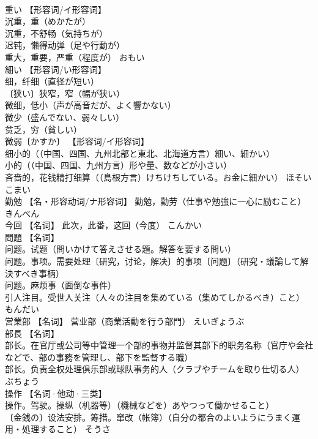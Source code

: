 \documentclass[8pt]{extreport}
\begin{document}
\begin{CJK}{UTF8}{min}
\\	重い	【形容词/イ形容词】 
\\	沉重，重（めかたが） 
\\	沉重，不舒畅（気持ちが） 
\\	迟钝，懒得动弹（足や行動が） 
\\	重大，重要，严重（程度が）	おもい	
\\	細い	【形容词/い形容词】 
\\	细，纤细（直径が短い） 
\\	〔狭い〕狭窄，窄（幅が狭い） 
\\	微细，低小（声が高音だが、よく響かない） 
\\	微少（盛んでない、弱々しい） 
\\	贫乏，穷（貧しい） 
\\	微弱〔かすか〕 【形容词/イ形容词】 
\\	细小的（（中国、四国、九州北部と東北、北海道方言）細い、細かい） 
\\	小的（（中国、四国、九州方言）形や量、数などが小さい） 
\\	吝啬的，花钱精打细算（（島根方言）けちけちしている。お金に細かい）	ほそい こまい	
\\	勤勉	【名・形容动词/ナ形容词】 勤勉，勤劳（仕事や勉強に一心に励むこと）	きんべん	
\\	今回	【名词】 此次，此番，这回（今度）	こんかい	
\\	問題	【名词】 
\\	问题。试题（問いかけて答えさせる題。解答を要する問い） 
\\	问题。事项。需要处理〔研究，讨论，解决〕的事项〔问题〕（研究・議論して解決すべき事柄） 
\\	问题。麻烦事（面倒な事件） 
\\	引人注目。受世人关注（人々の注目を集めている（集めてしかるべき）こと）	もんだい	
\\	営業部	【名词】 营业部（商業活動を行う部門）	えいぎょうぶ	
\\	部長	【名词】 
\\	部长。在官厅或公司等中管理一个部的事物并监督其部下的职务名称（官庁や会社などで、部の事務を管理し、部下を監督する職） 
\\	部长。负责全权处理俱乐部或球队事务的人（クラブやチームを取り仕切る人）	ぶちょう	
\\	操作	【名词·他动·三类】 
\\	操作。驾驶。操纵（机器等）（機械などを）あやつって働かせること） 
\\	〔金銭の〕设法安排。筹措。窜改（帐簿）（自分の都合のよいようにうまく運用・処理すること）	そうさ	

\end{CJK}
\end{document}
